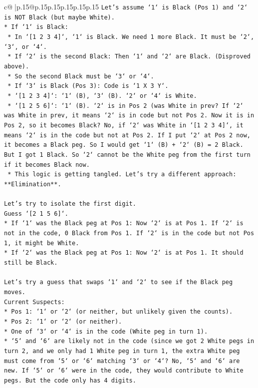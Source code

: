 \documentclass{article}
\begin{document}
{\begin{supertabular}{c@{$\;$}|p{.15\linewidth}@{}p{.15\linewidth}p{.15\linewidth}p{.15\linewidth}p{.15\linewidth}p{.15\linewidth}}
{{{\texttt{Let's assume `1` is Black (Pos 1) and `2` is NOT Black (but maybe White).} \\
\texttt{*   If `1` is Black:} \\
\texttt{    *   In `{[}1 2 3 4{]}`, `1` is Black. We need 1 more Black. It must be `2`, `3`, or `4`.} \\
\texttt{    *   If `2` is the second Black: Then `1` and `2` are Black. (Disproved above).} \\
\texttt{    *   So the second Black must be `3` or `4`.} \\
\texttt{    *   If `3` is Black (Pos 3): Code is `1 X 3 Y`.} \\
\texttt{        *   `{[}1 2 3 4{]}`: `1` (B), `3` (B). `2` or `4` is White.} \\
\texttt{        *   `{[}1 2 5 6{]}`: `1` (B). `2` is in Pos 2 (was White in prev? If `2` was White in prev, it means `2` is in code but not Pos 2. Now it is in Pos 2, so it becomes Black? No, if `2` was White in `{[}1 2 3 4{]}`, it means `2` is in the code but not at Pos 2. If I put `2` at Pos 2 now, it becomes a Black peg. So I would get `1` (B) + `2` (B) = 2 Black. But I got 1 Black. So `2` cannot be the White peg from the first turn if it becomes Black now.} \\
\texttt{        *   This logic is getting tangled. Let's try a different approach: **Elimination**.} \\
\\ 
\texttt{Let's try to isolate the first digit.} \\
\texttt{Guess `{[}2 1 5 6{]}`.} \\
\texttt{*   If `1` was the Black peg at Pos 1: Now `2` is at Pos 1. If `2` is not in the code, 0 Black from Pos 1. If `2` is in the code but not Pos 1, it might be White.} \\
\texttt{*   If `2` was the Black peg at Pos 1: Now `2` is at Pos 1. It should still be Black.} \\
\\ 
\texttt{Let's try a guess that swaps `1` and `2` to see if the Black peg moves.} \\
\texttt{Current Suspects:} \\
\texttt{*   Pos 1: `1` or `2` (or neither, but unlikely given the counts).} \\
\texttt{*   Pos 2: `1` or `2` (or neither).} \\
\texttt{*   One of `3` or `4` is in the code (White peg in turn 1).} \\
\texttt{*   `5` and `6` are likely not in the code (since we got 2 White pegs in turn 2, and we only had 1 White peg in turn 1, the extra White peg must come from `5` or `6` matching `3` or `4`? No, `5` and `6` are new. If `5` or `6` were in the code, they would contribute to White pegs. But the code only has 4 digits.} \\
}}}
\end{supertabular}}
\end{document}
